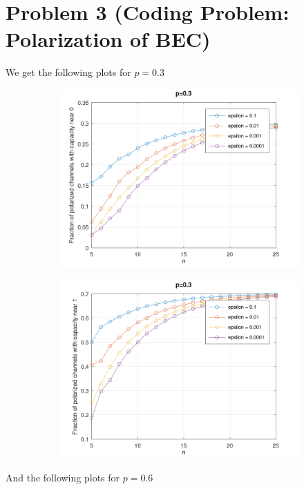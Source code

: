 \documentclass[a4paper,10pt]{article}
\begin{document}
\section*{Problem 3 (Coding Problem: Polarization of BEC)}
We get the following plots for $p=0.3$\\
\begin{figure}[H]
    \centering
    \begin{subfigure}{.5\textwidth}
\includegraphics[width=.9\linewidth]{code/p=0.3 near 0.png}
    \end{subfigure}%
    \begin{subfigure}{.5\textwidth}
\includegraphics[width=.9\linewidth]{code/p=0.3 near 1.png}
    \end{subfigure}
\end{figure}
And the following plots for $p=0.6$\\
\end{document}

